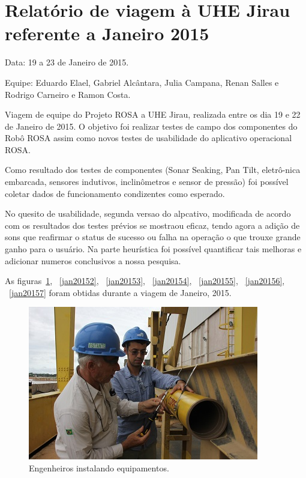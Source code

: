 \section{Relatório de viagem à UHE Jirau
referente a Janeiro 2015}
Data: 19 a 23 de Janeiro de 2015.

Equipe: Eduardo Elael, Gabriel Alcântara, Julia Campana, Renan Salles e Rodrigo Carneiro e Ramon Costa.

Viagem de equipe do Projeto ROSA a UHE Jirau, realizada entre
os dia 19 e 22 de Janeiro de 2015. O objetivo foi realizar testes de campo dos
componentes do Robô ROSA assim como novos testes de usabilidade do aplicativo
operacional ROSA.

Como resultado dos testes de componentes (Sonar Seaking, Pan Tilt, eletrô-\-nica
embarcada, sensores indutivos, inclinômetros e sensor de pressão) foi possível
coletar dados de funcionamento condizentes como esperado.

No quesito de usabilidade, segunda versao do alpcativo, modificada de acordo com
os resultados dos testes prévios se mostraou eficaz, tendo agora a adição de
sons que reafirmar o status de sucesso ou falha na operação o que trouxe grande
ganho para o usuário. Na parte heurística foi possível quantificar tais
melhoras e adicionar numeros conclusivos a nossa pesquisa.

As figuras~\ref{jan20151}, ~\ref{jan20152}, ~\ref{jan20153}, ~\ref{jan20154},
~\ref{jan20155}, ~\ref{jan20156}, ~\ref{jan20157} foram obtidas durante a viagem
de Janeiro, 2015.

\begin{figure}[h!]
\centering
  \includegraphics[width=1\linewidth]{Fotos/Janeiro2015/5.JPG}
  \caption{Engenheiros instalando equipamentos.}
  \label{jan20151}
\end{figure}

